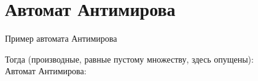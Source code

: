 \section{Автомат Антимирова}
\begin{frame}{Пример автомата Антимирова}
    \vspace{-5pt}

    Тогда (производные, равные пустому множеству, здесь опущены):\\
    Автомат Антимирова:

\end{frame}